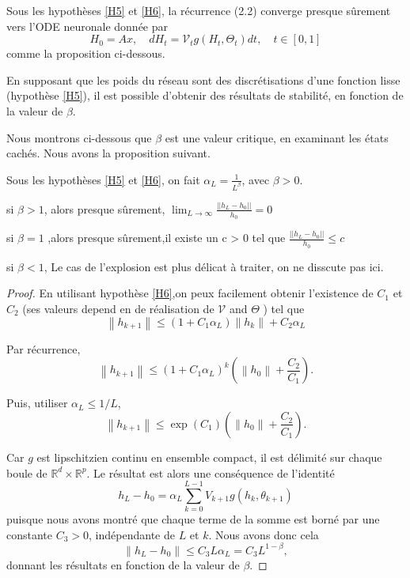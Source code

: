 Sous les hypothèses \ref{H5} et \ref{H6}, la récurrence (2.2) converge presque sûrement vers l'ODE neuronale donnée par
$$
H_0=A x, \quad d H_t=\mathscr{V}_t g\left(H_t, \Theta_t\right) d t, \quad t \in[0,1]
$$
comme la proposition ci-dessous.


En supposant que les poids du réseau sont des discrétisations d'une fonction lisse (hypothèse \ref{H5}), il est possible d'obtenir des résultats de stabilité, en fonction de la valeur de $\beta$.

Nous montrons ci-dessous que $\beta$ est une valeur critique, en examinant les états cachés. Nous avons la proposition suivant.

\begin{proposition}
    Sous les hypothèses \ref{H5} et \ref{H6}, on fait $\alpha_L = \frac{1}{L^{\beta}}$, avec $\beta >0 $.
    \item si $\beta > 1 $, alors presque sûrement, $\lim_{L \to \infty}\frac{||h_L-h_0||}{h_0} = 0 $
    \item si $\beta = 1 $ ,alors presque sûrement,il existe un c > 0 tel que $\frac{||h_L-h_0||}{h_0} \leqslant c$
    \item si $\beta < 1 $, Le cas de l'explosion est plus délicat à traiter, on ne disscute pas ici.
\end{proposition}

\begin{proof}\label{prop 4}
En utilisant hypothèse \ref{H6},on peux facilement obtenir l'existence de $C_1$ et $C_2$ (ses valeurs depend en de réalisation de $\mathscr{V}$ and $\Theta$ ) tel que
$$
\left\|h_{k+1}\right\| \leqslant\left(1+C_1 \alpha_L\right)\left\|h_k\right\|+C_2 \alpha_L
$$

Par récurrence,
$$
\left\|h_{k+1}\right\| \leqslant\left(1+C_1 \alpha_L\right)^k\left(\left\|h_0\right\|+\frac{C_2}{C_1}\right) .
$$


Puis, utiliser $\alpha_L \leqslant 1 / L$,
$$
\left\|h_{k+1}\right\| \leqslant \exp \left(C_1\right)\left(\left\|h_0\right\|+\frac{C_2}{C_1}\right) .
$$

Car $g$ est lipschitzien continu en ensemble compact, il est délimité sur chaque boule de $\mathbb{R}^d \times \mathbb{R}^p$. Le résultat est alors une conséquence de l’identité
$$
h_L-h_0=\alpha_L \sum_{k=0}^{L-1} V_{k+1} g\left(h_k, \theta_{k+1}\right)
$$
puisque nous avons montré que chaque terme de la somme est borné par une constante $C_3>0$, indépendante de $L$ et $k$. Nous avons donc cela 
$$
\left\|h_L-h_0\right\| \leqslant C_3 L \alpha_L=C_3 L^{1-\beta},
$$
donnant les résultats en fonction de la valeur de $\beta$.
\end{proof}

